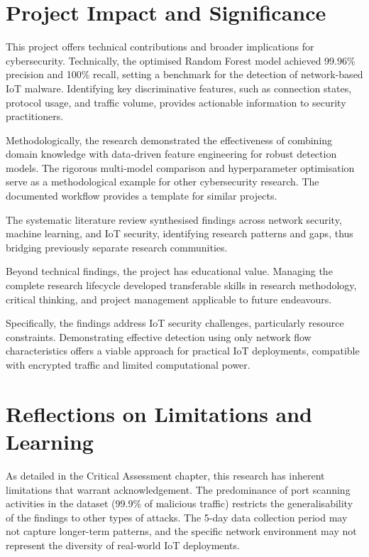 \section{Project Impact and Significance}

This project offers technical contributions and broader implications for cybersecurity. Technically, the optimised Random Forest model achieved 99.96\% precision and 100\% recall, setting a benchmark for the detection of network-based IoT malware. Identifying key discriminative features, such as connection states, protocol usage, and traffic volume, provides actionable information to security practitioners.

Methodologically, the research demonstrated the effectiveness of combining domain knowledge with data-driven feature engineering for robust detection models. The rigorous multi-model comparison and hyperparameter optimisation serve as a methodological example for other cybersecurity research. The documented workflow provides a template for similar projects.

The systematic literature review synthesised findings across network security, machine learning, and IoT security, identifying research patterns and gaps, thus bridging previously separate research communities.

Beyond technical findings, the project has educational value. Managing the complete research lifecycle developed transferable skills in research methodology, critical thinking, and project management applicable to future endeavours.

Specifically, the findings address IoT security challenges, particularly resource constraints. Demonstrating effective detection using only network flow characteristics offers a viable approach for practical IoT deployments, compatible with encrypted traffic and limited computational power.

\section{Reflections on Limitations and Learning}

As detailed in the Critical Assessment chapter, this research has inherent limitations that warrant acknowledgement. The predominance of port scanning activities in the dataset (99.9\% of malicious traffic) restricts the generalisability of the findings to other types of attacks. The 5-day data collection period may not capture longer-term patterns, and the specific network environment may not represent the diversity of real-world IoT deployments.

